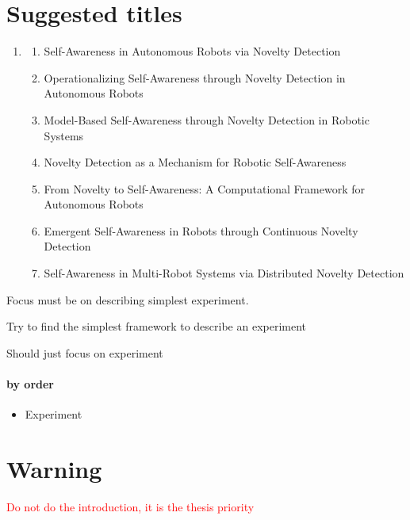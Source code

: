 \documentclass[a4paper]{article}
\title{}
\date{}
\begin{document}
    \maketitle
    
    \section{Suggested titles}
        \begin{enumerate}
            \item
                \begin{enumerate}
                          \item Self-Awareness in Autonomous Robots via Novelty Detection
                          \item Operationalizing Self-Awareness through Novelty Detection in Autonomous Robots
                          \item Model-Based Self-Awareness through Novelty Detection in Robotic Systems
                          \item Novelty Detection as a Mechanism for Robotic Self-Awareness
                          \item From Novelty to Self-Awareness: A Computational Framework for Autonomous Robots
                          \item Emergent Self-Awareness in Robots through Continuous Novelty Detection
                          \item Self-Awareness in Multi-Robot Systems via Distributed Novelty Detection
                \end{enumerate}
        \end{enumerate}
    
    Focus must be on describing simplest experiment.
    
    Try to find the simplest framework to describe an experiment
    
    Should just focus on experiment
    
    \paragraph{by order}
        \begin{itemize}
            \item Experiment
        \end{itemize}
    
    
    \section{Warning}
    \textcolor{red}{Do not do the introduction, it is the thesis priority}
    
    
\end{document}
